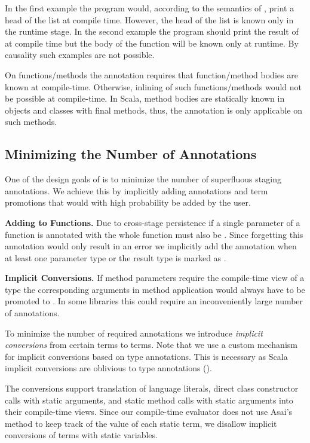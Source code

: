 In the first example the program would, according to the semantics of , print a head of the list at compile time.
 However, the head of the list is known only in the runtime stage. In the second example the program should
 print the result of  at compile time but the body of the function will
 be known only at runtime. By causality such examples are not possible.

On functions/methods the  annotation requires that function/method bodies are known at compile-time.
 Otherwise, inlining of such functions/methods would not be possible at compile-time. In Scala,
 method bodies are statically known in objects and classes with final methods, thus, the 
 annotation is only applicable on such methods.

\subsection{Minimizing the Number of Annotations}
\label{sct:implicits}

One of the design goals of \tool is to minimize the number of superfluous staging annotations. We achieve
 this by implicitly adding annotations and term promotions that would with high probability be added by the user.

{\bf Adding  to Functions.} Due to cross-stage persistence if a single parameter of
a function is annotated with  the whole function must also be . Since forgetting
this annotation would only result in an error we implicitly add
the  annotation when at least one parameter type or the result type is marked as .

{\bf Implicit Conversions.} If method parameters require the compile-time view of a type the corresponding arguments
 in method application would always have to be promoted to .
 In some libraries this could require an inconveniently large number of annotations.

To minimize the number of required annotations we introduce \emph{implicit conversions}
 from certain  terms to  terms. Note that we use a custom mechanism for
 implicit conversions based on type annotations. This is necessary as Scala implicit conversions
 are oblivious to type annotations ().

The conversions support translation of language literals, direct class constructor calls with static arguments, and static method
 calls with static arguments into their compile-time views. Since our compile-time evaluator does
 not use Asai's~\cite{asai2002binding,sumii2001hybrid} method to keep track of
 the value of each static term, we disallow implicit conversions of terms with static variables.

